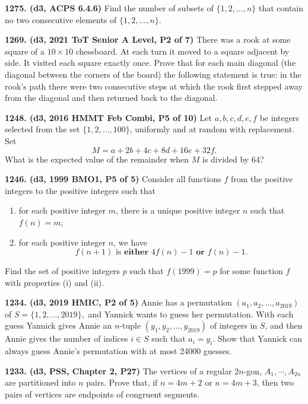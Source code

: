 \documentclass{article}
\begin{document}
        \textbf{1275. (\color{red}d3\color{black}, ACPS 6.4.6)} Find the number of subsets of \(\{1,2,\ldots,n\}\) that contain no two consecutive elements of \(\{1,2,\ldots,n\}\).

        \textbf{1269. (\color{red}d3\color{black}, 2021 ToT Senior A Level, P2 of 7)} There was a rook at some square of a $10 \times 10$ chessboard. At each turn it moved to a square
        adjacent by side. It visited each square exactly once. Prove that for each main diagonal (the
        diagonal between the corners of the board) the following statement is true: in the rook's path
        there were two consecutive steps at which the rook first stepped away from the diagonal and
        then returned back to the diagonal.

        \textbf{1248. (\color{red}d3\color{black}, 2016 HMMT Feb Combi, P5 of 10)} Let $a, b, c, d, e, f$ be integers selected from the set $\{1, 2, \ldots , 100\}$, uniformly and at random with
        replacement. Set
        \[M = a + 2b + 4c + 8d + 16e + 32f.\]
        What is the expected value of the remainder when $M$ is divided by 64?

        \textbf{1246. (\color{red}d3\color{black}, 1999 BMO1, P5 of 5)} Consider all functions $f$ from the positive integers to the positive integers such that \begin{enumerate}\item {for each positive integer $m$, there is a unique positive integer $n$ such that $f(n) = m$;}\item {for each positive integer $n$, we have \begin{equation*}f(n+1) \text{ is} \textbf{ either } 4f(n)-1 \textbf{ or } f(n)-1.\end{equation*}}\end{enumerate}Find the set of positive integers $p$ such that $f(1999) = p$ for some function $f$ with properties (i) and (ii).

        \textbf{1234. (\color{red}d3\color{black}, 2019 HMIC, P2 of 5)} Annie has a permutation $(a_1, a_2, \ldots , a_{2019})$ of $S = \{1, 2, \ldots , 2019\},$ and Yannick wants to guess her
        permutation. With each guess Yannick gives Annie an $n$-tuple $(y_1, y_2, . . . , y_{2019})$ of integers in $S$, and
        then Annie gives the number of indices $i \in S$ such that $a_i = y_i$. Show that Yannick can always guess Annie's permutation with at most 24000 guesses.

        \textbf{1233. (\color{red}d3\color{black}, PSS, Chapter 2, P27)} The vertices of a regular $2n$-gon, $A_1 , \cdots , A_{2n}$ are partitioned into $n$ pairs. Prove that, if $n = 4m + 2$ or $n = 4m + 3$, then two pairs of vertices are endpoints of congruent segments.
\end{document}
